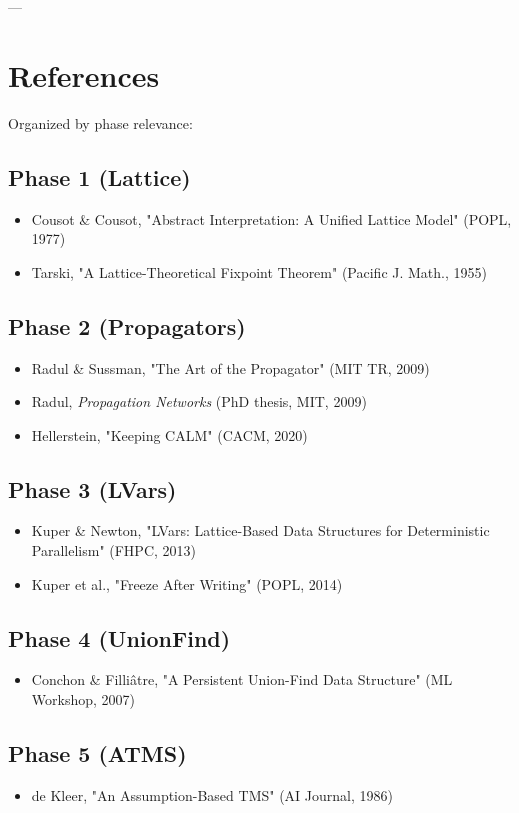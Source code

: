 \documentclass[11pt]{article}
\begin{document}
---
\section{References}
\label{sec:orge930b03}

Organized by phase relevance:
\subsection{Phase 1 (Lattice)}
\label{sec:org32f9f64}
\begin{itemize}
\item Cousot \& Cousot, "Abstract Interpretation: A Unified Lattice Model" (POPL, 1977)
\item Tarski, "A Lattice-Theoretical Fixpoint Theorem" (Pacific J. Math., 1955)
\end{itemize}
\subsection{Phase 2 (Propagators)}
\label{sec:org59e97e5}
\begin{itemize}
\item Radul \& Sussman, "The Art of the Propagator" (MIT TR, 2009)
\item Radul, \emph{Propagation Networks} (PhD thesis, MIT, 2009)
\item Hellerstein, "Keeping CALM" (CACM, 2020)
\end{itemize}
\subsection{Phase 3 (LVars)}
\label{sec:org74c5373}
\begin{itemize}
\item Kuper \& Newton, "LVars: Lattice-Based Data Structures for Deterministic Parallelism" (FHPC, 2013)
\item Kuper et al., "Freeze After Writing" (POPL, 2014)
\end{itemize}
\subsection{Phase 4 (UnionFind)}
\label{sec:org6cdebfe}
\begin{itemize}
\item Conchon \& Filliâtre, "A Persistent Union-Find Data Structure" (ML Workshop, 2007)
\end{itemize}
\subsection{Phase 5 (ATMS)}
\label{sec:orga124539}
\begin{itemize}
\item de Kleer, "An Assumption-Based TMS" (AI Journal, 1986)
\end{itemize}
\end{document}

